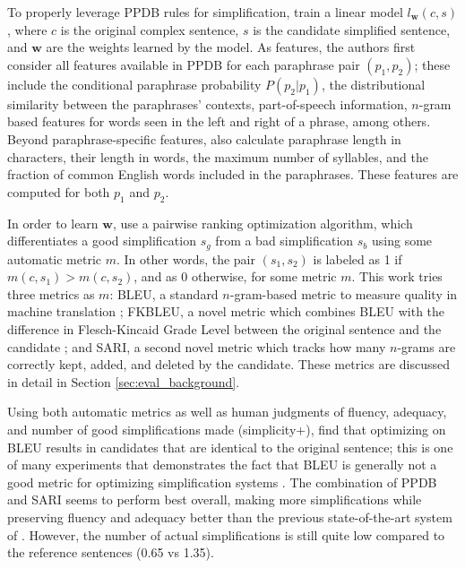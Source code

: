 \documentclass[thesis.tex]{subfiles}
\begin{document}
To properly leverage PPDB rules for simplification, \cite{xu2016optimizing} train a linear model $l_{\textbf{w}}(c, s)$, where $c$ is the original complex sentence, $s$ is the candidate simplified sentence, and $\textbf{w}$ are the weights learned by the model. As features, the authors first consider all features available in PPDB for each paraphrase pair $(p_1, p_2)$; these include the conditional paraphrase probability $P(p_2|p_1)$, the distributional similarity between the paraphrases' contexts, part-of-speech information, $n$-gram based features for words seen in the left and right of a phrase, among others. Beyond paraphrase-specific features, \cite{xu2016optimizing} also calculate paraphrase length in characters, their length in words, the maximum number of syllables, and the fraction of common English words included in the paraphrases. These features are computed for both $p_1$ and $p_2$.

In order to learn $\textbf{w}$, \cite{xu2016optimizing} use a pairwise ranking optimization algorithm, which differentiates a good simplification $s_g$ from a bad simplification $s_b$ using some automatic metric $m$. In other words, the pair $(s_1, s_2)$ is labeled as 1 if $m(c, s_1) > m(c, s_2)$, and as 0 otherwise, for some metric $m$. This work tries three metrics as $m$: BLEU, a standard $n$-gram-based metric to measure quality in machine translation \citep{papineni2002bleu}; FKBLEU, a novel metric which combines BLEU with the difference in Flesch-Kincaid Grade Level between the original sentence and the candidate \citep{kincaid1975derivation}; and SARI, a second novel metric which tracks how many $n$-grams are correctly kept, added, and deleted by the candidate. These metrics are discussed in detail in Section \ref{sec:eval_background}.

Using both automatic metrics as well as human judgments of fluency, adequacy, and number of good simplifications made (simplicity+), \cite{xu2016optimizing} find that optimizing on BLEU results in candidates that are identical to the original sentence; this is one of many experiments that demonstrates the fact that BLEU is generally not a good metric for optimizing simplification systems \citep{sulem2018bleu}. The combination of PPDB and SARI seems to perform best overall, making more simplifications while preserving fluency and adequacy better than the previous state-of-the-art system of \cite{wubben2012sentence}. However, the number of actual simplifications is still quite low compared to the reference sentences (0.65 vs 1.35).
\end{document}
